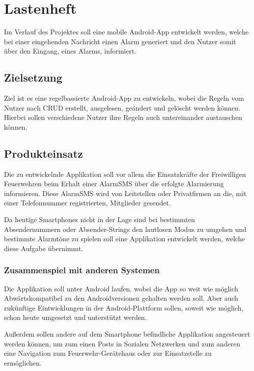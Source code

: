 \section{Lastenheft}
Im Verlauf des Projektes soll eine mobile Android-App entwickelt werden, welche bei einer eingehenden Nachricht einen Alarm generiert und den Nutzer somit \"uber den Eingang, eines Alarms, informiert.

\subsection{Zielsetzung}
Ziel ist es eine regelbassierte Android-App zu entwickeln, wobei die Regeln vom Nutzer nach CRUD erstellt, ausgelesen, ge\"andert und gel\"oscht werden k\"onnen. Hierbei sollen verschiedene Nutzer ihre Regeln auch untereinander austauschen k\"onnen.

\subsection{Produkteinsatz}
Die zu entwickelnde Applikation soll vor allem die Einsatzkr\"afte der Freiwilligen Feuerwehren beim Erhalt einer AlarmSMS \"uber die erfolgte Alarmierung informieren. Diese AlarmSMS wird von Leitstellen oder Privatfirmen an die, mit einer Telefonnummer registrierten, Mitglieder gesendet.

Da heutige Smartphones nicht in der Lage sind bei bestimmten Absendernummern oder Absender-Strings den lautlosen Modus zu umgehen und bestimmte Alarmt\"one zu spielen soll eine Applikation entwickelt werden, welche diese Aufgabe \"ubernimmt.

\subsubsection{Zusammenspiel mit anderen Systemen}
Die Applikation soll unter Android laufen, wobei die App so weit wie m\"oglich Abw\"artskompatibel zu den Androidversionen gehalten werden soll. Aber auch zuk\"unftige Eintwicklungen in der Android-Plattform sollen, soweit wie m\"oglich, schon heute umgesetzt und unterst\"utzt werden.

Au\ss{}erdem sollen andere auf dem Smartphone befindliche Applikation angesteuert werden k\"onnen, um zum einen Posts in Sozialen Netzwerken und zum anderen eine Navigation zum Feuerwehr-Ger\"atehaus oder zur Einsatzstelle zu erm\"oglichen.

